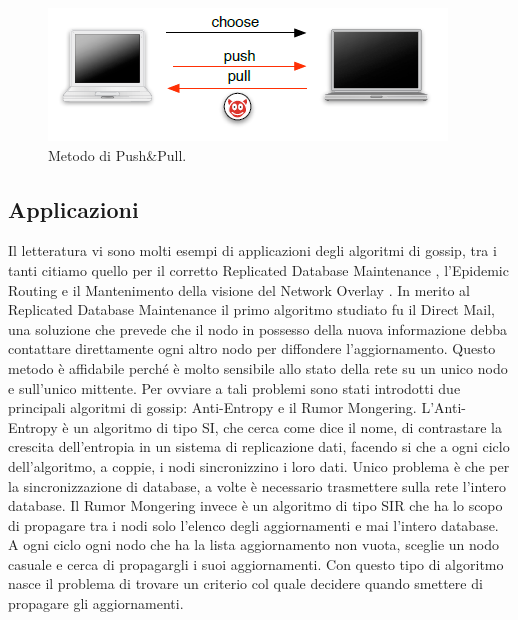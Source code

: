 \begin{figure}[h]
	\centering
	\includegraphics[width=0.6\linewidth,keepaspectratio]{Images/algoritmi_gossip/push_pull}
	\caption[Metodo di Push\&Pull]{Metodo di Push\&Pull\cite{schindel2004-epidemicAlg}.}
	\label{fig:push_pull}
\end{figure}

\subsection{Applicazioni}
Il letteratura vi sono molti esempi di applicazioni degli algoritmi di gossip, tra i tanti citiamo quello per il corretto Replicated Database Maintenance \cite{montresor2004-antiEntropy}, l'Epidemic Routing e il Mantenimento della visione del Network Overlay \cite{montresor2004-overlay}. In merito al Replicated Database Maintenance il primo algoritmo studiato fu il Direct Mail, una soluzione che prevede che il nodo in possesso della nuova informazione debba contattare direttamente ogni altro nodo per diffondere l'aggiornamento. Questo metodo è affidabile perché è molto sensibile allo stato della rete su un unico nodo e sull'unico mittente. Per ovviare a tali problemi sono stati introdotti due principali algoritmi di gossip: Anti-Entropy e il Rumor Mongering. L'Anti-Entropy è un algoritmo di tipo SI, che cerca come dice il nome, di contrastare la crescita dell'entropia in un sistema di replicazione dati, facendo si che a ogni ciclo dell'algoritmo, a coppie, i nodi sincronizzino i loro dati. Unico problema è che per la sincronizzazione di database, a volte è necessario trasmettere sulla rete l'intero database. Il Rumor Mongering invece è un algoritmo di tipo SIR che ha lo scopo di propagare tra i nodi solo l'elenco degli aggiornamenti e mai l'intero database. A ogni ciclo ogni nodo che ha la lista aggiornamento non vuota, sceglie un nodo casuale e cerca di propagargli i suoi aggiornamenti. Con questo tipo di algoritmo nasce il problema di trovare un criterio col quale decidere quando smettere di propagare gli aggiornamenti.
 
